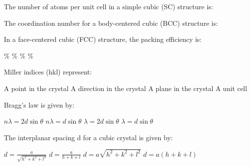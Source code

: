 \begin{question}[2]
The number of atoms per unit cell in a simple cubic (SC) structure is:

\begin{oneparcheckboxes}
\end{oneparcheckboxes}
\end{question}

\begin{question}[2]
The coordination number for a body-centered cubic (BCC) structure is:

\begin{oneparcheckboxes}
\end{oneparcheckboxes}
\end{question}

\begin{question}[2]
In a face-centered cubic (FCC) structure, the packing efficiency is:

\begin{oneparcheckboxes}
\%
\%
\%
\%
\end{oneparcheckboxes}
\end{question}

\begin{question}[2]
Miller indices (hkl) represent:

\begin{oneparcheckboxes}
\choice A point in the crystal
\choice A direction in the crystal
\correctchoice A plane in the crystal
\choice A unit cell
\end{oneparcheckboxes}
\end{question}

\begin{question}[2]
Bragg's law is given by:

\begin{oneparcheckboxes}
\correctchoice $\displaystyle n\lambda = 2d\sin\theta$
\choice $\displaystyle n\lambda = d\sin\theta$
\choice $\displaystyle \lambda = 2d\sin\theta$
\choice $\displaystyle \lambda = d\sin\theta$
\end{oneparcheckboxes}
\end{question}

\begin{question}[2]
The interplanar spacing d for a cubic crystal is given by:

\begin{oneparcheckboxes}
\correctchoice $\displaystyle d = \frac{a}{\sqrt{h^2 + k^2 + l^2}}$
\choice $\displaystyle d = \frac{a}{h + k + l}$
\choice $\displaystyle d = a\sqrt{h^2 + k^2 + l^2}$
\choice $\displaystyle d = a(h + k + l)$
\end{oneparcheckboxes}
\end{question}

